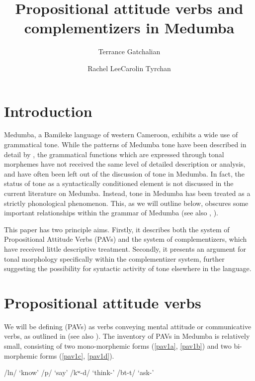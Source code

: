 \documentclass[output=paper,colorlinks,citecolor=brown]{langscibook}
\author{Terrance Gatchalian\affiliation{University of British Columbia}\and Rachel Lee\affiliation{University of British Columbia}\lastand  Carolin Tyrchan\affiliation{University of Potsdam}}
\title{Propositional attitude verbs and complementizers in Medumba}
\begin{document}
\maketitle

\section{Introduction}

Medumba, a Bamileke language of western Cameroon, exhibits a wide use of grammatical tone. While the patterns of Medumba tone have been described in detail by \cite{Voorhoeve1971}, the grammatical functions which are expressed through tonal morphemes have not received the same level of detailed description or analysis, and have often been left out of the discussion of tone in Medumba. In fact, the status of tone as a syntactically conditioned element is not discussed in the current literature on Medumba. Instead, tone in Medumba has been treated as a strictly phonological phenomenon. This, as we will outline below, obscures some important relationships within the grammar of Medumba (see also \citeauthor{KeupdjioForthcoming}, \citeyear{KeupdjioForthcoming}).

This paper has two principle aims. Firstly, it describes both the system of Propositional Attitude Verbs (PAVs) and the system of complementizers, which have received little descriptive treatment. Secondly, it presents an argument for tonal morphology specifically within the complementizer system, further suggesting the possibility for syntactic activity of tone elsewhere in the language.

\section{Propositional attitude verbs}

We will be defining  (PAVs) as verbs conveying mental attitude or communicative verbs, as outlined in \citet{PearsonForthcoming} (see also \citealt{Asher1987}). The inventory of PAVs in Medumba is relatively small, consisting of two mono-morphemic forms (\ref{pav1a}, \ref{pav1b}) and two bi-morphemic forms (\ref{pav1c}, \ref{pav1d}).

\ea \label{PAV1}
    \begin{xlist}
    \ex /l\epL n/                   \tab `know'                  \label{pav1a}
    \ex /p/                   \tab `say'                   \label{pav1b}
    \ex /kʷ\epL-d\schwaL/   \tab `think-'      \label{pav1c}
    \ex /b\epH t-t\schwaH/          \tab `ask-'        \label{pav1d}
    \end{xlist}
\z
\end{document}

